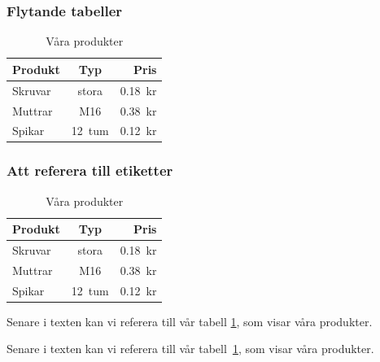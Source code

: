 \begin{frame}[fragile,t]
  \frametitle{Flytande tabeller}
  \vspace{2em}



  \begin{exlatex}
\begin{table}[t]
  \begin{tabular}{|l|c|r|}
    Produkt & Typ    & Pris    \\
    \hline
    Skruvar & stora  & 0.18~kr \\
    Muttrar & M16    & 0.38~kr \\
    Spikar  & 12~tum & 0.12~kr
  \end{tabular}
  \caption{Våra produkter}
\end{table}
  \end{exlatex}
\end{frame}

\begin{frame}[fragile,t]
  \frametitle{Att referera till etiketter}
  \vspace{1em}



  \begin{exlatex}
\begin{table}
  \begin{tabular}{lcr}
    Produkt & Typ    & Pris    \\
    \hline
    Skruvar & stora  & 0.18~kr \\
    Muttrar & M16    & 0.38~kr \\
    Spikar  & 12~tum & 0.12~kr
  \end{tabular}
  \caption{Våra produkter}
  \label{produkter}
\end{table}
Senare i texten kan vi referera till vår tabell \ref{produkter}, som visar våra produkter.

Senare i texten kan vi referera till vår tabell~\ref{produkter}, som visar våra produkter.
  \end{exlatex}

\end{frame}

